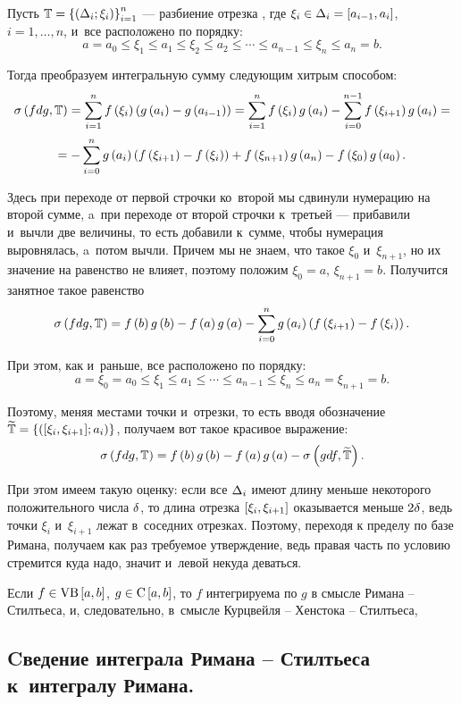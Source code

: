 \documentclass[draft]{article}
\begin{document}
\pr

Пусть $\T=\dixif_{i=1}^n$ --- разбиение отрезка \ab, где
$\xii\in\dei=\seg[a_{i-1},a_i]$, $i=1,\dots,n$, и~все расположено по
порядку: $$a=a_0\le\xi_1\le a_1\le\xi_2\le a_2\le\cdots\le
a_{n-1}\le\xi_n\le a_n=b.$$


Тогда преобразуем интегральную сумму следующим хитрым способом:
$$\isfdgT=\sum_{i=1}^nf\at(\xii)\at({g\at(a_i)-g\at(a_{i-1})})=
\sum_{i=1}^nf\at(\xii)g\at(a_i)-\sum_{i=0}^{n-1}f\at(\xi_{i+1})g\at(a_i)=$$
$$=-\sum_{i=0}^ng\at(a_i)\at({f\at(\xi_{i+1})-f\at(\xii)})+
f\at(\xi_{n+1})g\at(a_n)-f\at(\xi_0)g\at(a_0).$$

Здесь при переходе от первой строчки ко~второй мы сдвинули нумерацию
на второй сумме, a~при переходе от второй строчки к~третьей ---
прибавили и~вычли две величины, то есть добавили к~сумме, чтобы
нумерация выровнялась, a~потом вычли. Причем мы не знаем, что такое
$\xi_0$ и~$\xi_{n+1}$, но их значение на равенство не влияет,
поэтому положим $\xi_0=a$, $\xi_{n+1}=b$. Получится занятное такое
равенство
$$\isfdgT=f\at(b)g\at(b)-f\at(a)g\at(a)-\sum_{i=0}^ng\at(a_i)\at({f\at(\xi_{i+1})-f\at(\xii)}).$$

При этом, как и~раньше, все расположено по порядку:
$$a=\xi_0=a_0\le\xi_1\le a_1\le\cdots\le a_{n-1}\le\xi_n\le
a_n=\xi_{n+1}=b.$$

Поэтому, меняя местами точки и~отрезки, то есть вводя обозначение
$\Tt=\set{\pair(\seg[\xi_i,\xi_{i+1}];a_i)}$, получаем вот такое
красивое выражение:
$$\isfdgT=f\at(b)g\at(b)-f\at(a)g\at(a)-\isum(gdf,\Tt).$$

При этом имеем такую оценку: если все $\Delta_i$ имеют длину меньше
некоторого положительного числа $\delta$, то длина отрезка
$\seg[\xi_i,\xi_{i+1}]$ оказывается меньше $2\delta$, ведь точки
$\xi_i$ и~$\xi_{i+1}$ лежат в~соседних отрезках. Поэтому, переходя к
пределу по базе Римана, получаем как раз требуемое утверждение, ведь
правая часть по условию стремится куда надо, значит и~левой некуда
деваться.

\prtm

\bigskip

\imp

Если $f\isvb\segab$, $g\isc\segab$, то $f$ интегрируема по $g$ в
смысле Римана -- Стилтьеса, и, следовательно, в~смысле Курцвейля --
Хенстока -- Стилтьеса,

\eject

\subsection{Cведение интеграла Римана -- Стилтьеса к~интегралу Римана.}
\end{document}
